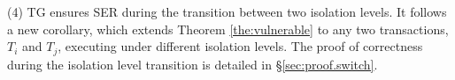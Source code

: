 {%
(4) TG ensures SER during the transition between two isolation levels. It follows a new corollary, which extends Theorem \ref{the:vulnerable} 
to any two transactions, $T_i$ and $T_j$, executing under different isolation levels. 
The proof of correctness during the isolation level transition is detailed in \S\ref{sec:proof.switch}.


}
